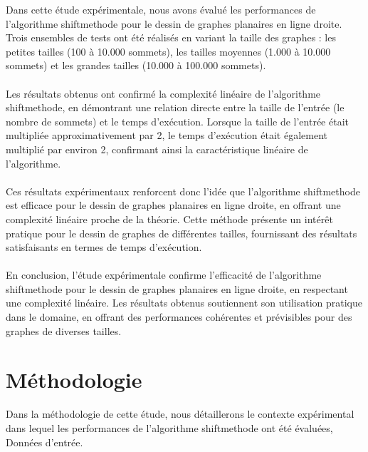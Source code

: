 \documentclass[hidelinks,letterpaper,12pt]{article}
\begin{document}
\newpage

Dans cette étude expérimentale, nous avons évalué les performances de l'algorithme shiftmethode pour le dessin de graphes planaires en ligne droite. Trois ensembles de tests ont été réalisés en variant la taille des graphes : les petites tailles (100 à 10.000 sommets), les tailles moyennes (1.000 à 10.000 sommets) et les grandes tailles (10.000 à 100.000 sommets).
\\ \\
Les résultats obtenus ont confirmé la complexité linéaire de l'algorithme shiftmethode, en démontrant une relation directe entre la taille de l'entrée (le nombre de sommets) et le temps d'exécution. Lorsque la taille de l'entrée était multipliée approximativement par 2, le temps d'exécution était également multiplié par environ 2, confirmant ainsi la caractéristique linéaire de l'algorithme.
\\ \\
Ces résultats expérimentaux renforcent donc l'idée que l'algorithme shiftmethode est efficace pour le dessin de graphes planaires en ligne droite, en offrant une complexité linéaire proche de la théorie. Cette méthode présente un intérêt pratique pour le dessin de graphes de différentes tailles, fournissant des résultats satisfaisants en termes de temps d'exécution.
\\ \\
En conclusion, l'étude expérimentale confirme l'efficacité de l'algorithme shiftmethode pour le dessin de graphes planaires en ligne droite, en respectant une complexité linéaire. Les résultats obtenus soutiennent son utilisation pratique dans le domaine, en offrant des performances cohérentes et prévisibles pour des graphes de diverses tailles.

\newpage
\section{Méthodologie}
Dans la méthodologie de cette étude, nous détaillerons le contexte expérimental dans lequel les performances de l'algorithme shiftmethode ont été évaluées, Données d'entrée. 
\\
\end{document}
